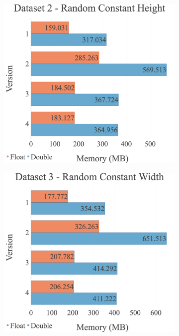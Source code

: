 \begin{figure}[H]
\begin{adjustwidth}{-2cm}{-2cm}
\begin{subfigure}{.62\textwidth}
\end{subfigure}
\par\bigskip
\par\bigskip
\begin{subfigure}{.62\textwidth}
  \centering
  \includegraphics[width=1\textwidth]{img/experiments/mem-option-versions-2_RANDCONSTHEIGHT.png}
\end{subfigure}
\begin{subfigure}{.62\textwidth}
  \centering
  \includegraphics[width=1\textwidth]{img/experiments/mem-option-versions-3_RANDCONSTWIDTH.png}
\end{subfigure}
\end{adjustwidth}
\end{figure}

